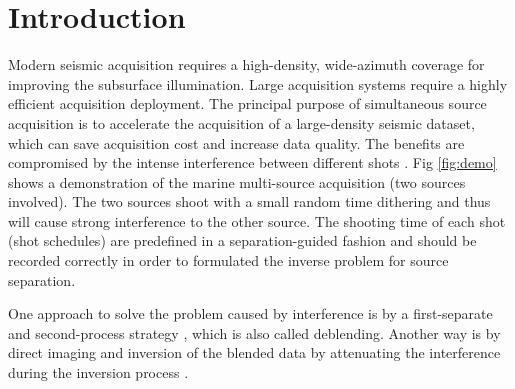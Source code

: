 \section{Introduction}
Modern seismic acquisition requires a high-density, wide-azimuth coverage for improving the subsurface illumination. Large acquisition systems require a highly efficient acquisition deployment. The principal purpose of simultaneous source acquisition is to accelerate the acquisition of a large-density seismic dataset, which can save acquisition cost and increase data quality. The benefits are compromised by the intense interference between different shots \cite{beasleycj1998,berkhout2008,abma2009}. Fig \ref{fig:demo} shows a demonstration of the marine multi-source acquisition (two sources involved). The two sources shoot with a small random time dithering and thus will cause strong interference to the other source. The shooting time of each shot (shot schedules) are predefined in a separation-guided fashion and should be recorded correctly in order to formulated the inverse problem for source separation.

One approach to solve the problem caused by interference is by a first-separate and second-process strategy \cite{beasleycj1998,berkhout2008,abma2009,yangkang20142}, which is also called deblending. Another way is by direct imaging and inversion of the blended data by attenuating the interference during the inversion process \cite{berkhout2008,verschuur2011,zhiguang2014,yangkang2015image}. 

